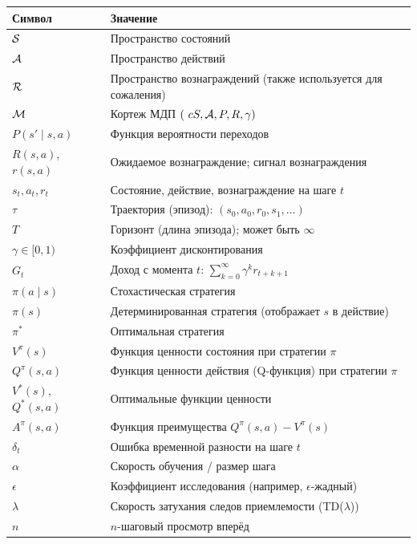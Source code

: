 \begin{center}
\begin{tabular}{@{}ll@{}}
\toprule
\textbf{Символ} & \textbf{Значение} \\
\midrule
$\mathcal{S}$               & Пространство состояний \\
$\mathcal{A}$               & Пространство действий \\
$\mathcal{R}$               & Пространство вознаграждений (также используется для сожаления) \\
$\mathcal{M}$               & Кортеж МДП $(\ cS,\cA,P,R,\gamma)$ \\
$P(s'\mid s,a)$     & Функция вероятности переходов \\
$R(s,a)$, $r(s,a)$  & Ожидаемое вознаграждение; сигнал вознаграждения \\
$s_t, a_t, r_t$     & Состояние, действие, вознаграждение на шаге $t$ \\
$\tau$              & Траектория (эпизод): $(s_0,a_0,r_0,s_1,\ldots)$ \\
$T$                 & Горизонт (длина эпизода); может быть $\infty$ \\
$\gamma \in [0,1)$  & Коэффициент дисконтирования \\
$G_t$               & Доход с момента $t$: $\sum_{k=0}^{\infty}\gamma^k r_{t+k+1}$ \\
$\pi(a\mid s)$      & Стохастическая стратегия \\
$\pi(s)$            & Детерминированная стратегия (отображает $s$ в действие) \\
$\pi^*$             & Оптимальная стратегия \\
$V^\pi(s)$          & Функция ценности состояния при стратегии $\pi$ \\
$Q^\pi(s,a)$        & Функция ценности действия (Q-функция) при стратегии $\pi$ \\
$V^*(s)$, $Q^*(s,a)$ & Оптимальные функции ценности \\
$A^\pi(s,a)$        & Функция преимущества $Q^\pi(s,a)-V^\pi(s)$ \\
$\delta_t$          & Ошибка временной разности на шаге $t$ \\
$\alpha$            & Скорость обучения / размер шага \\
$\epsilon$          & Коэффициент исследования (например, $\epsilon$-жадный) \\
$\lambda$           & Скорость затухания следов приемлемости (TD($\lambda$)) \\
$n$                 & $n$-шаговый просмотр вперёд \\

\end{tabular}
\end{center}
